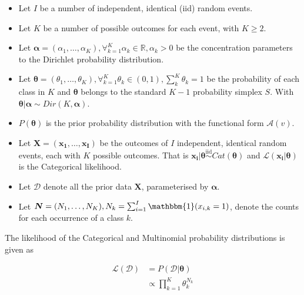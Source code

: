 \begin{itemize}
      \item Let $I$ be a number of independent, identical (iid) random events.

      \item Let $K$ be a number of possible outcomes for each event, with $K \geq 2$.

      \item Let $\boldsymbol{\alpha} = (\alpha_{1}, \dots, \alpha_{K}), \forall_{k=1}^{K} \alpha_{k} \in \mathbb{R}, \alpha_{k} > 0$ be the concentration parameters to the Dirichlet probability distribution.

      \item Let $\boldsymbol{\theta} = (\theta_{1}, \dots, \theta_{K}), \forall_{k=1}^{K} \theta_{k} \in (0,1), \sum_{k}^{K} \theta_{k} = 1$ be the probability of each class in $K$ and $\boldsymbol{\theta}$ belongs to the standard $K-1$ probability simplex $S$. With $\boldsymbol{\theta} | \boldsymbol{\alpha} \sim Dir(K, \boldsymbol{\alpha})$.

      \item $P(\boldsymbol{\theta})$ is the prior probability distribution with the functional form $\mathcal{A}(v)$.

      \item Let $\boldsymbol{X} = (\boldsymbol{x_{1}}, \dots, \boldsymbol{x_{I}})$ be the outcomes of $I$ independent, identical random events, each with $K$ possible outcomes. That is $\boldsymbol{x_{i}} | \boldsymbol{\theta} \overset{\text{iid}}{\sim} Cat(\boldsymbol{\theta})$ and $\mathcal{L}(\boldsymbol{x_{i}} \vert \boldsymbol{\theta})$ is the Categorical likelihood.

      \item Let $\boldsymbol{\mathcal{D}}$ denote all the prior data $\boldsymbol{X}$, parameterised by $\boldsymbol{\alpha}$.

      \item Let $\boldsymbol{N} = (N_{1}, \dots, N_{K}), N_{k} = \sum_{i=1}^{I} \mathbbm{1}(x_{i,k} = 1)$, denote the counts for each occurrence of a class $k$.
\end{itemize}

The likelihood of the Categorical and Multinomial probability distributions is given as

\begin{equation}
      \label{eq:probability:conjugate_priors:mult_likelihood:likelihood}
      \begin{split}
            \mathcal{L}(\boldsymbol{\mathcal{D}}) &=  P(\boldsymbol{\mathcal{D}} | \boldsymbol{\theta}) \\
            &\propto \prod_{k=1}^{K} \theta_{k}^{N_{k}}
      \end{split}
\end{equation}

